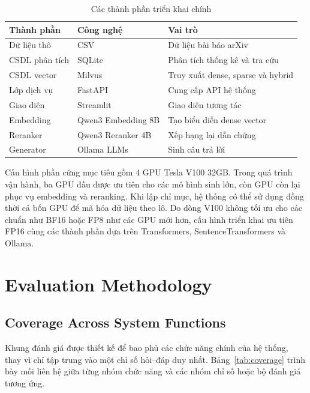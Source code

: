 \documentclass[conference]{IEEEtran}
\begin{document}
\begin{table}[t]
\caption{Các thành phần triển khai chính}
\label{tab:components}
\centering
\small
\setlength{\tabcolsep}{3pt}
\begin{tabular}{p{}p{}p{}}
\toprule
\textbf{Thành phần} & \textbf{Công nghệ} & \textbf{Vai trò}\\
\midrule
Dữ liệu thô & CSV & Dữ liệu bài báo arXiv\\
CSDL phân tích & SQLite & Phân tích thống kê và tra cứu\\
CSDL vector & Milvus & Truy xuất dense, sparse và hybrid\\
Lớp dịch vụ & FastAPI & Cung cấp API hệ thống\\
Giao diện & Streamlit & Giao diện tương tác\\
Embedding & Qwen3 Embedding 8B & Tạo biểu diễn dense vector\\
Reranker & Qwen3 Reranker 4B & Xếp hạng lại dẫn chứng\\
Generator & Ollama LLMs & Sinh câu trả lời\\
\bottomrule
\end{tabular}
\end{table}

Cấu hình phần cứng mục tiêu gồm 4 GPU Tesla V100 32GB. Trong quá trình vận hành, ba GPU đầu được ưu tiên cho các mô hình sinh lớn, còn GPU còn lại phục vụ embedding và reranking. Khi lập chỉ mục, hệ thống có thể sử dụng đồng thời cả bốn GPU để mã hóa dữ liệu theo lô. Do dòng V100 không tối ưu cho các chuẩn như BF16 hoặc FP8 như các GPU mới hơn, cấu hình triển khai ưu tiên FP16 cùng các thành phần dựa trên Transformers, SentenceTransformers và Ollama.

\section{Evaluation Methodology}

\subsection{Coverage Across System Functions}

Khung đánh giá được thiết kế để bao phủ các chức năng chính của hệ thống, thay vì chỉ tập trung vào một chỉ số hỏi--đáp duy nhất. Bảng~\ref{tab:coverage} trình bày mối liên hệ giữa từng nhóm chức năng và các nhóm chỉ số hoặc bộ đánh giá tương ứng.
\end{document}
